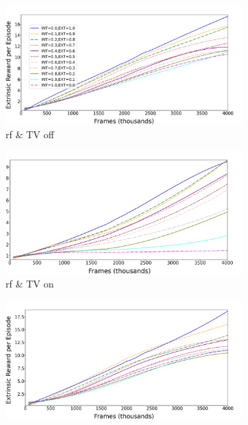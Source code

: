 \documentclass[draft,final]{vutinfth} %
\begin{document}
    \begin{figure}[h]
        \begin{adjustwidth}{-3.0cm}{-2.0cm}
            \begin{subfigure}[t]{0.5\linewidth}
                \centering
                \includegraphics[width=1\textwidth]{figures/breakout/tv/rf_noTV.png}
                \caption{\acrlong{rf} \& TV off}
            \end{subfigure}
            \begin{subfigure}[t]{0.5\linewidth}
                \centering
                \includegraphics[width=1\textwidth]{figures/breakout/tv/rf_TV.png}
                \caption{\acrlong{rf} \& TV on}
            \end{subfigure}
            \begin{subfigure}[t]{0.5\linewidth}
                \centering
                \includegraphics[width=1\textwidth]{figures/breakout/tv/idf_noTV.png}

\end{subfigure}
\end{adjustwidth}
\end{figure}
\end{document}
